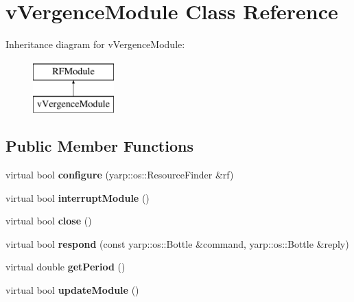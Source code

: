\hypertarget{classvVergenceModule}{}\section{v\+Vergence\+Module Class Reference}
\label{classvVergenceModule}
Inheritance diagram for v\+Vergence\+Module\+:\begin{figure}[H]
\begin{center}
\leavevmode
\includegraphics[height=2.000000cm]{classvVergenceModule}
\end{center}
\end{figure}
\subsection*{Public Member Functions}
\begin{DoxyCompactItemize}
\item 
virtual bool {\bfseries configure} (yarp\+::os\+::\+Resource\+Finder \&rf)\hypertarget{classvVergenceModule_af5adccf2e4e683156898b873c0c08988}{}\label{classvVergenceModule_af5adccf2e4e683156898b873c0c08988}

\item 
virtual bool {\bfseries interrupt\+Module} ()\hypertarget{classvVergenceModule_aaeb20d7a6c54c7e062e81449909f7108}{}\label{classvVergenceModule_aaeb20d7a6c54c7e062e81449909f7108}

\item 
virtual bool {\bfseries close} ()\hypertarget{classvVergenceModule_a3a1ff9fa51ab9f0ceba8e64bcef3cd83}{}\label{classvVergenceModule_a3a1ff9fa51ab9f0ceba8e64bcef3cd83}

\item 
virtual bool {\bfseries respond} (const yarp\+::os\+::\+Bottle \&command, yarp\+::os\+::\+Bottle \&reply)\hypertarget{classvVergenceModule_a43c817d4e7da3d93d4ee82b2b2c0441c}{}\label{classvVergenceModule_a43c817d4e7da3d93d4ee82b2b2c0441c}

\item 
virtual double {\bfseries get\+Period} ()\hypertarget{classvVergenceModule_a42f1b19c3560a5a474a78278c0263338}{}\label{classvVergenceModule_a42f1b19c3560a5a474a78278c0263338}

\item 
virtual bool {\bfseries update\+Module} ()\hypertarget{classvVergenceModule_a068dd0cb890c7c6c868ffa3f58866837}{}\label{classvVergenceModule_a068dd0cb890c7c6c868ffa3f58866837}

\end{DoxyCompactItemize}


